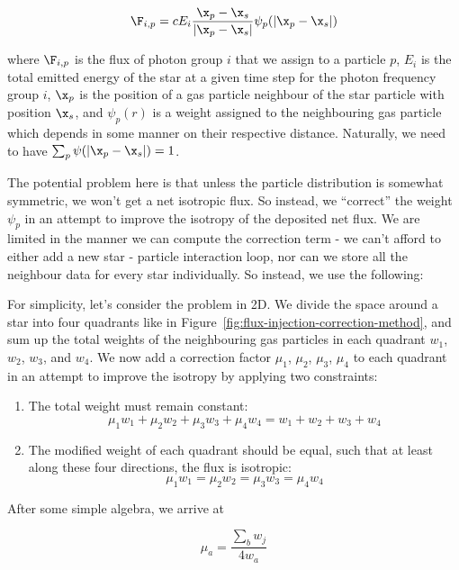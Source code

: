\begin{equation}
	\F_{i,p} = c E_i \frac{\x_p - \x_s}{|\x_p - \x_s|} \psi_p(|\x_p - \x_s|)
\end{equation}

where $\F_{i,p}$ is the flux of photon group $i$ that we assign to a particle $p$, $E_i$ is the total emitted energy of the star at a given time step for the photon frequency group $i$, $\x_p$ is the position of a gas particle neighbour of the star particle with position $\x_s$, and $\psi_p(r)$ is a weight assigned to the neighbouring gas particle which depends in some manner on their respective distance. Naturally, we need to have $\sum_p \psi(|\x_p - \x_s|) = 1$.

The potential problem here is that unless the particle distribution is somewhat symmetric, we won't get a net isotropic flux. So instead, we ``correct'' the weight $\psi_p$ in an attempt to improve the isotropy of the deposited net flux. We are limited in the manner we can compute the correction term - we can't afford to either add a new star - particle interaction loop, nor can we store all the neighbour data for every star individually. So instead, we use the following:

For simplicity, let's consider the problem in 2D. We divide the space around a star into four quadrants like in Figure~\ref{fig:flux-injection-correction-method}, and sum up the total weights of the neighbouring gas particles in each quadrant $w_1$, $w_2$, $w_3$, and $w_4$. We now add a correction factor $\mu_1$,  $\mu_2$,  $\mu_3$,  $\mu_4$ to each quadrant in an attempt to improve the isotropy by applying two constraints:

\begin{enumerate}
\item The total weight must remain constant:
\begin{equation}
\mu_1 w_1 + \mu_2 w_2 + \mu_3 w_3 + \mu_4 w_4 = w_1 + w_2 + w_3 + w_4
\end{equation}

\item The modified weight of each quadrant should be equal, such that at least along these four directions, the flux is isotropic:
\begin{equation}
\mu_1 w_1 = \mu_2 w_2 = \mu_3 w_3 = \mu_4 w_4
\end{equation}
\end{enumerate}

After some simple algebra, we arrive at

\begin{equation}
\mu_a = \frac{\sum_b w_j}{4 w_a} \label{eq:isotropy-correction-general}
\end{equation}

